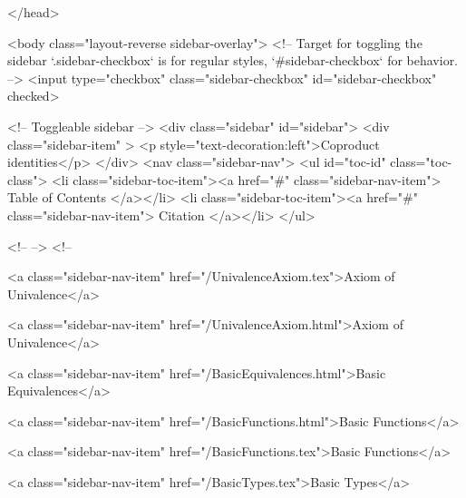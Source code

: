   
</head>




  <body class="layout-reverse sidebar-overlay">
    <!-- Target for toggling the sidebar `.sidebar-checkbox` is for regular
     styles, `#sidebar-checkbox` for behavior. -->
<input type="checkbox" class="sidebar-checkbox" id="sidebar-checkbox" checked>

<!-- Toggleable sidebar -->
<div class="sidebar" id="sidebar">
  <div class="sidebar-item" >
    <p style="text-decoration:left">Coproduct identities</p>
  </div>
  <nav class="sidebar-nav">
    <ul id="toc-id" class="toc-class">
  <li class="sidebar-toc-item"><a href="#" class="sidebar-nav-item"> Table of Contents </a></li>
  <li class="sidebar-toc-item"><a href="#" class="sidebar-nav-item"> Citation </a></li>
</ul>


    <!--  -->
    <!-- 
      
    
      
    
      
    
      
    
      
        
      
    
      
        
          <a class="sidebar-nav-item" href="/UnivalenceAxiom.tex">Axiom of Univalence</a>
        
      
    
      
        
          <a class="sidebar-nav-item" href="/UnivalenceAxiom.html">Axiom of Univalence</a>
        
      
    
      
        
          <a class="sidebar-nav-item" href="/BasicEquivalences.html">Basic Equivalences</a>
        
      
    
      
        
          <a class="sidebar-nav-item" href="/BasicFunctions.html">Basic Functions</a>
        
      
    
      
        
          <a class="sidebar-nav-item" href="/BasicFunctions.tex">Basic Functions</a>
        
      
    
      
        
          <a class="sidebar-nav-item" href="/BasicTypes.tex">Basic Types</a>
        
